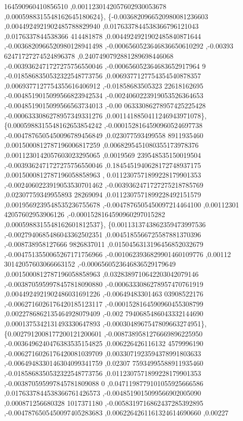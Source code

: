 \begin{DoxyCode}
      164590960410856510 ,0.0011230142057602930053678 ,0.0005988315548162645180624\},
\{-0.0036820966520980081236603 ,0.0044924921902485788829940 ,0.0176337844538366796121043 ,0.0176337844538366
      414481878 ,0.0044924921902485840871644 ,-0.0036820966520980128941498 ,-0.0006560523646836650610292 ,-0.00393
      62471727274524896378 ,0.2407490792881289698446068 ,-0.0039362471727275756550046 ,-0.000656052364683652917964
      9 ,-0.0185868350532322548773756 ,0.0069377127754354540878357 ,0.0069377127754355616406912 ,-0.01858683505323
      22618162695 ,-0.0048519015099566823942534 ,-0.0024060223919053526364653 ,-0.0048519015099566563734013 ,-0.00
      06333086278957425225428 ,-0.0006333086278957349331276 ,0.0011418850411246943971078\},
\{0.0005988315548162653854242 ,-0.0001528164590960524697738 ,-0.0047876505450096789456849 ,0.023077593499558
      8911935460 ,0.0015000812787196006817259 ,0.0068295451080355173978376 ,0.0011230142057603023295065 ,0.0019569
      239548535150019504 ,-0.0039362471727275756550046 ,0.1845451940628172748937175 ,0.0015000812787196058858963 ,
      0.0112307571899228179901353 ,-0.0024060223919053530701462 ,-0.0039362471727275218785769 ,0.02307759349955893
      28269094 ,0.0112307571899228492151579 ,0.0019569239548535236755678 ,-0.0047876505450097214464100 ,0.00112301
      42057602953906126 ,-0.0001528164590960297015282 ,0.0005988315548162601812537\},
\{0.0011313743862359473997536 ,-0.0027940685486043362502351 ,0.0045185566725587881370396 ,-0.008738958127666
      9826837011 ,0.0150456313196456852032679 ,-0.0047513550065267171756966 ,-0.0010623936829901460109776 ,0.00112
      30142057603066663152 ,-0.0006560523646836529179649 ,0.0015000812787196058858963 ,0.0328389710642203042079146
       ,-0.0038705959978457818090880 ,-0.0006333086278957470761919 ,0.0044924921902486031691226 ,-0.00649483301463
      03908522176 ,-0.0062716026176420185123117 ,-0.0001528164590960455308799 ,0.0022786862135464928079409 ,-0.002
      7940685486043332144690 ,0.0001375342131493330647893 ,-0.0003048967547809663274951\},
\{0.0027912008177200121200601 ,-0.0087389581276669896225950 ,-0.0036496240476383535154825 ,0.006226426116132
      4579996190 ,-0.0062716026176420081039709 ,0.0033071923594378991803633 ,-0.0064948330146304099341759 ,0.02307
      75934995588911935460 ,-0.0185868350532322548773756 ,0.0112307571899228179901353 ,-0.003870595997845781809088
      0 ,0.0471198779101055925666586 ,0.0176337844538366761426573 ,-0.0048519015099566902005090 ,0.000871256680328
      1017371180 ,-0.0058319716862437285392895 ,-0.0047876505450097405283683 ,0.0062264261161324614690660 ,0.00227

\end{DoxyCode}
